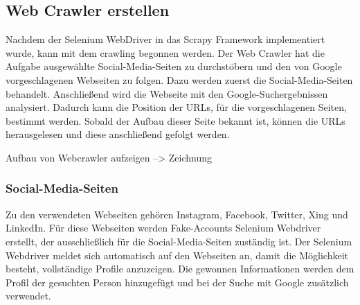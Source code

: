 		\subsection{Web Crawler erstellen}

		Nachdem der Selenium WebDriver in das Scrapy Framework implementiert wurde, kann mit dem crawling begonnen werden. Der Web Crawler hat die Aufgabe ausgewählte Social-Media-Seiten zu durchstöbern und den von Google vorgeschlagenen Webseiten zu folgen. Dazu werden zuerst die Social-Media-Seiten behandelt. Anschließend wird die Webseite mit den Google-Suchergebnissen analysiert. Dadurch kann die Position der URLs, für die vorgeschlagenen Seiten, bestimmt werden. Sobald der Aufbau dieser Seite bekannt ist, können die URLs herausgelesen und diese anschließend gefolgt werden.
		
		Aufbau von Webcrawler aufzeigen --> Zeichnung
		
			\subsubsection{Social-Media-Seiten}
			Zu den verwendeten Webseiten gehören Instagram, Facebook, Twitter, Xing und LinkedIn. Für diese Webseiten werden Fake-Accounts Selenium Webdriver erstellt, der ausschließlich für die Social-Media-Seiten zuständig ist. Der Selenium Webdriver meldet sich automatisch auf den Webseiten an, damit die Möglichkeit besteht, vollständige Profile anzuzeigen. Die gewonnen Informationen werden dem Profil der gesuchten Person hinzugefügt und bei der Suche mit Google zusätzlich verwendet.
			
